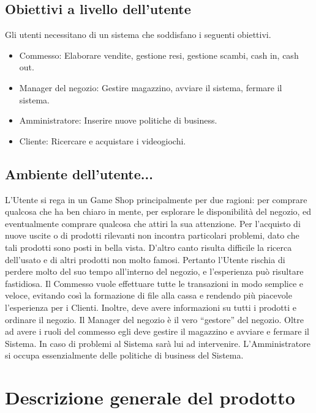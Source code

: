 \documentclass[a4paper,10pt]{report}
\begin{document}
  \subsection*{Obiettivi a livello dell'utente}
  Gli utenti necessitano di un sistema che soddisfano i seguenti obiettivi.
  \begin{itemize}
   \item Commesso: Elaborare vendite, gestione resi, gestione scambi, cash in, cash out.
   \item Manager del negozio: Gestire magazzino, avviare il sistema, fermare il sistema.
   \item Amministratore: Inserire nuove politiche di business.
   \item Cliente: Ricercare e acquistare i videogiochi.
  \end{itemize}

  \subsection*{Ambiente dell'utente...}
  L’Utente si rega in un Game Shop principalmente per due ragioni: per comprare qualcosa
che ha ben chiaro in mente, per esplorare le disponibilità del negozio, ed eventualmente
comprare qualcosa che attiri la sua attenzione. Per l’acquisto di nuove uscite o di prodotti
rilevanti non incontra particolari problemi, dato che tali prodotti sono posti in bella vista.
D’altro canto risulta difficile la ricerca dell’usato e di altri prodotti non molto famosi.
Pertanto l’Utente rischia di perdere molto del suo tempo all’interno del negozio, e
l’esperienza può risultare fastidiosa.
Il Commesso vuole effettuare tutte le transazioni in modo semplice e veloce, evitando così
la formazione di file alla cassa e rendendo più piacevole l’esperienza per i Clienti. Inoltre,
deve avere informazioni su tutti i prodotti e ordinare il negozio.
Il Manager del negozio è il vero “gestore” del negozio. Oltre ad avere i ruoli del commesso
egli deve gestire il magazzino e avviare e fermare il Sistema. In caso di problemi al
Sistema sarà lui ad intervenire.
L’Amministratore si occupa essenzialmente delle politiche di business del Sistema.

  \section*{Descrizione generale del prodotto}
  
\end{document}
